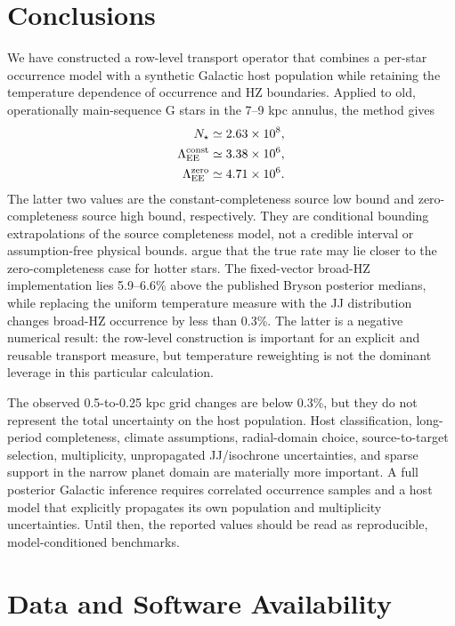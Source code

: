 \section{Conclusions}\label{sec:conclusions}

We have constructed a row-level transport operator that combines a per-star occurrence model with a synthetic Galactic host population while retaining the temperature dependence of occurrence and HZ boundaries. Applied to old, operationally main-sequence G stars in the 7--9 kpc annulus, the method gives
\begin{align}
 N_\star&\simeq2.63\times10^8,\nonumber\\
 \Lambda_{\rm EE}^{\rm const}&\simeq3.38\times10^6,\nonumber\\
 \Lambda_{\rm EE}^{\rm zero}&\simeq4.71\times10^6.
\end{align}
The latter two values are the constant-completeness source low bound and zero-completeness source high bound, respectively. They are conditional bounding extrapolations of the source completeness model, not a credible interval or assumption-free physical bounds. \citet{Bryson2021} argue that the true rate may lie closer to the zero-completeness case for hotter stars. The fixed-vector broad-HZ implementation lies 5.9--6.6\% above the published Bryson posterior medians, while replacing the uniform temperature measure with the JJ distribution changes broad-HZ occurrence by less than 0.3\%. The latter is a negative numerical result: the row-level construction is important for an explicit and reusable transport measure, but temperature reweighting is not the dominant leverage in this particular calculation.

The observed 0.5-to-0.25 kpc grid changes are below 0.3\%, but they do not represent the total uncertainty on the host population. Host classification, long-period completeness, climate assumptions, radial-domain choice, source-to-target selection, multiplicity, unpropagated JJ/isochrone uncertainties, and sparse support in the narrow planet domain are materially more important. A full posterior Galactic inference requires correlated occurrence samples and a host model that explicitly propagates its own population and multiplicity uncertainties. Until then, the reported values should be read as reproducible, model-conditioned benchmarks.

\section{Data and Software Availability}\label{sec:data}


